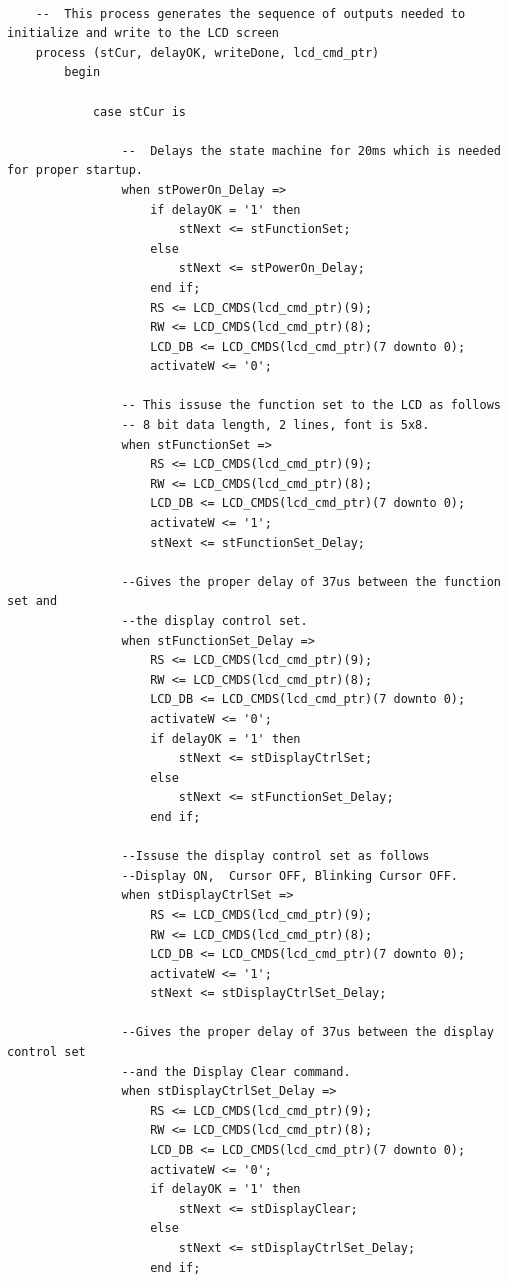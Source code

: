 \documentclass[a4paper,12pt,twoside]{article}
\begin{document}
\begin{lstlisting}
	
	--  This process generates the sequence of outputs needed to initialize and write to the LCD screen
    process (stCur, delayOK, writeDone, lcd_cmd_ptr)
        begin   
		
            case stCur is
			
                --  Delays the state machine for 20ms which is needed for proper startup.
				when stPowerOn_Delay =>
                    if delayOK = '1' then
                        stNext <= stFunctionSet;
                    else
                        stNext <= stPowerOn_Delay;
                    end if;
                    RS <= LCD_CMDS(lcd_cmd_ptr)(9);
                    RW <= LCD_CMDS(lcd_cmd_ptr)(8);
                    LCD_DB <= LCD_CMDS(lcd_cmd_ptr)(7 downto 0);
                    activateW <= '0';

                -- This issuse the function set to the LCD as follows 
                -- 8 bit data length, 2 lines, font is 5x8.
                when stFunctionSet =>
                    RS <= LCD_CMDS(lcd_cmd_ptr)(9);
                    RW <= LCD_CMDS(lcd_cmd_ptr)(8);
                    LCD_DB <= LCD_CMDS(lcd_cmd_ptr)(7 downto 0);
                    activateW <= '1';	
                    stNext <= stFunctionSet_Delay;
				
                --Gives the proper delay of 37us between the function set and
                --the display control set.
                when stFunctionSet_Delay =>
                    RS <= LCD_CMDS(lcd_cmd_ptr)(9);
                    RW <= LCD_CMDS(lcd_cmd_ptr)(8);
                    LCD_DB <= LCD_CMDS(lcd_cmd_ptr)(7 downto 0);
                    activateW <= '0';
                    if delayOK = '1' then
                        stNext <= stDisplayCtrlSet;
                    else
                        stNext <= stFunctionSet_Delay;
                    end if;
				
                --Issuse the display control set as follows
                --Display ON,  Cursor OFF, Blinking Cursor OFF.
                when stDisplayCtrlSet =>
                    RS <= LCD_CMDS(lcd_cmd_ptr)(9);
                    RW <= LCD_CMDS(lcd_cmd_ptr)(8);
                    LCD_DB <= LCD_CMDS(lcd_cmd_ptr)(7 downto 0);
                    activateW <= '1';
                    stNext <= stDisplayCtrlSet_Delay;

                --Gives the proper delay of 37us between the display control set
                --and the Display Clear command. 
                when stDisplayCtrlSet_Delay =>
                    RS <= LCD_CMDS(lcd_cmd_ptr)(9);
                    RW <= LCD_CMDS(lcd_cmd_ptr)(8);
                    LCD_DB <= LCD_CMDS(lcd_cmd_ptr)(7 downto 0);
                    activateW <= '0';
                    if delayOK = '1' then
                        stNext <= stDisplayClear;
                    else
                        stNext <= stDisplayCtrlSet_Delay;
                    end if;
				

\end{lstlisting}
\end{document}
